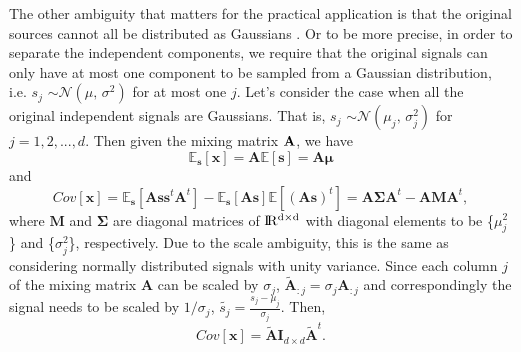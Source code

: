 \documentclass[aps,prl,preprint,superscriptaddress]{revtex4-2}
\begin{document}
The other ambiguity that matters for the practical application is that the original sources cannot all be distributed as Gaussians \cite{lee1998independent, ng_cs229}. Or to be more precise, in order to separate the independent components, we require that the original signals can only have at most one component to be sampled from a Gaussian distribution, i.e. $s_{j}$ $\sim \mathcal{N}(\mu,\,\sigma^{2})$ for at most one $j$. Let's consider the case when all the original independent signals are Gaussians. That is, $s_{j}$ $\sim \mathcal{N}(\mu_{j},\,\sigma_{j}^{2})$ for $j = 1, 2, ..., d$. Then given the mixing matrix $\bf{A}$, we have 
\begin{equation}
\mathbb{E}_{\mathbf{s}}[\mathbf{x}] = \mathbf{A}\mathbb{E}[\mathbf{s}] = \mathbf{A}\bm{\mu}
\end{equation}
and 
\begin{equation}
Cov[\mathbf{x}] = \mathbb{E}_{\mathbf{s}}[\mathbf{As}\mathbf{s}^t\mathbf{A}^{t}]-\mathbb{E}_{\mathbf{s}}[\mathbf{As}]\mathbb{E}[(\mathbf{As})^{t}] =  \mathbf{A}\bm{\Sigma}\mathbf{A}^{t}-\mathbf{A}\mathbf{M}\mathbf{A}^{t},
\end{equation} where $\mathbf{M}$ and $\bm{\Sigma}$ are diagonal matrices of $\rm I\!R^{d\times d}$ with diagonal elements to be \{$\mu_{j}^{2}$\} and \{$\sigma_{j}^{2}$\}, respectively. Due to the scale ambiguity, this is the same as considering normally distributed signals with unity variance. Since each column $j$ of the mixing matrix $\mathbf{A}$ can be scaled by $\sigma_{j}$, $\tilde{\mathbf{A}}_{:j} = \sigma_{j}\mathbf{A}_{:j}$ and correspondingly the signal needs to be scaled by $1/\sigma_{j}$, $\tilde{s_{j}} = \frac{s_{j}-\mu_{j}}{\sigma_{j}}$. Then, 
\begin{equation}
Cov[\mathbf{x}] = \tilde{\mathbf{A}}\mathbf{I}_{d\times d}\tilde{\mathbf{A}}^{t}.
\end{equation}
\end{document}
